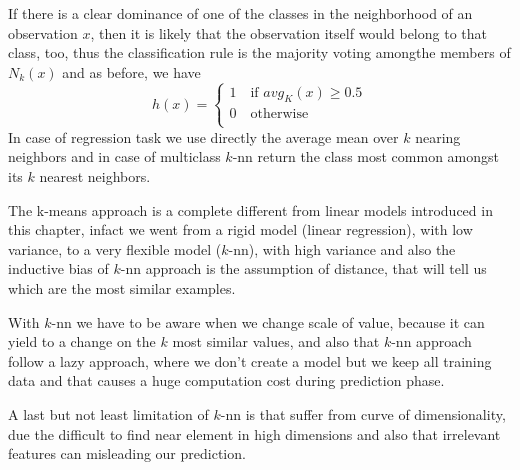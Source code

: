 If there is a clear dominance of one of the classes in the neighborhood of an observation $x$, then it is likely that the observation itself would belong to that class, too, 
thus the classification rule is the majority voting amongthe members of $N_k(x)$ and as before, we have 
\[ h(x) = \begin{cases}
		1 \quad \text{if } avg_K(x) \geq 0.5 \\
		0 \quad \text{otherwise} \\
	  \end{cases} \]
In case of regression task we use directly the average mean over $k$ nearing neighbors and in case of multiclass $k$-nn return the class most common amongst its $k$ nearest neighbors.

The k-means approach is a complete different from linear models introduced in this chapter, infact we went from a rigid model (linear regression), with low variance, to a very flexible model ($k$-nn),
with high variance and also the inductive bias of $k$-nn approach is the assumption of distance, that will tell us which are the most similar examples.

With $k$-nn we have to be aware when we change scale of value, because it can yield to a change on the $k$ most similar values, and also that $k$-nn approach follow a lazy approach,
where we don't create a model but we keep all training data and that causes a huge computation cost during prediction phase.

A last but not least limitation of $k$-nn is that suffer from curve of dimensionality, due the difficult to find near element in high dimensions and also that irrelevant features can
misleading our prediction.
